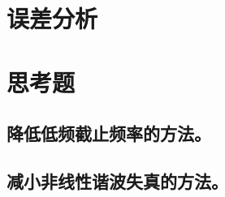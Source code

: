\documentclass[a4paper]{article}
\begin{document}
\section{误差分析}

\section{思考题}
\subsection{降低低频截止频率的方法。}
\subsection{减小非线性谐波失真的方法。}


\end{document}

